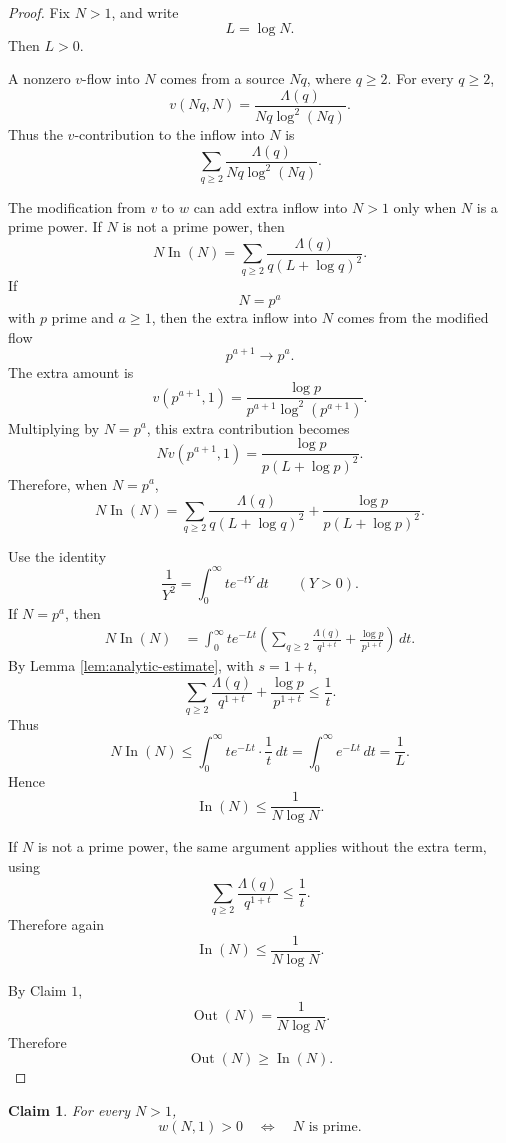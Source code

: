 \documentclass{amsart}
\newtheorem{claim}{Claim}
\begin{document}
\begin{proof}
Fix \(N>1\), and write
\[
L=\log N.
\]
Then \(L>0\).

A nonzero \(v\)-flow into \(N\) comes from a source \(Nq\), where \(q\geq 2\).  For every \(q\geq 2\),
\[
v(Nq,N)=\frac{\Lambda(q)}{Nq\log^2(Nq)}.
\]
Thus the \(v\)-contribution to the inflow into \(N\) is
\[
\sum_{q\geq 2}\frac{\Lambda(q)}{Nq\log^2(Nq)}.
\]

The modification from \(v\) to \(w\) can add extra inflow into \(N>1\) only when \(N\) is a prime power.  If \(N\) is not a prime power, then
\[
N\operatorname{In}(N)
=
\sum_{q\geq 2}
\frac{\Lambda(q)}{q(L+\log q)^2}.
\]
If
\[
N=p^a
\]
with \(p\) prime and \(a\geq 1\), then the extra inflow into \(N\) comes from the modified flow
\[
p^{a+1}\longrightarrow p^a.
\]
The extra amount is
\[
v(p^{a+1},1)
=
\frac{\log p}{p^{a+1}\log^2(p^{a+1})}.
\]
Multiplying by \(N=p^a\), this extra contribution becomes
\[
N v(p^{a+1},1)
=
\frac{\log p}{p(L+\log p)^2}.
\]
Therefore, when \(N=p^a\),
\[
N\operatorname{In}(N)
=
\sum_{q\geq 2}
\frac{\Lambda(q)}{q(L+\log q)^2}
+
\frac{\log p}{p(L+\log p)^2}.
\]

Use the identity
\[
\frac{1}{Y^2}
=
\int_0^\infty t e^{-tY}\,dt
\qquad (Y>0).
\]
If \(N=p^a\), then
\[
\begin{aligned}
N\operatorname{In}(N)
&=
\int_0^\infty
t e^{-Lt}
\left(
\sum_{q\geq 2}\frac{\Lambda(q)}{q^{1+t}}
+
\frac{\log p}{p^{1+t}}
\right)
\,dt.
\end{aligned}
\]
By Lemma \ref{lem:analytic-estimate}, with \(s=1+t\),
\[
\sum_{q\geq 2}\frac{\Lambda(q)}{q^{1+t}}
+
\frac{\log p}{p^{1+t}}
\leq
\frac{1}{t}.
\]
Thus
\[
N\operatorname{In}(N)
\leq
\int_0^\infty t e^{-Lt}\cdot \frac{1}{t}\,dt
=
\int_0^\infty e^{-Lt}\,dt
=
\frac{1}{L}.
\]
Hence
\[
\operatorname{In}(N)\leq \frac{1}{N\log N}.
\]

If \(N\) is not a prime power, the same argument applies without the extra term, using
\[
\sum_{q\geq 2}\frac{\Lambda(q)}{q^{1+t}}
\leq
\frac{1}{t}.
\]
Therefore again
\[
\operatorname{In}(N)\leq \frac{1}{N\log N}.
\]

By Claim \(1\),
\[
\operatorname{Out}(N)=\frac{1}{N\log N}.
\]
Therefore
\[
\operatorname{Out}(N)\geq \operatorname{In}(N).
\]
\end{proof}

\begin{claim}
For every \(N>1\),
\[
w(N,1)>0
\quad\Longleftrightarrow\quad
N \text{ is prime}.
\]
\end{claim}
\end{document}
